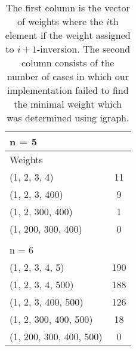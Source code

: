 \documentclass{article}
\begin{document}
\begin{table}[ht]
  \centering
  \begin{tabularx}{\linewidth}{lc}
  \multicolumn{2}{l}{n = 5} \\
  \midrule
  Weights &  \\
  \midrule
  (1, 2, 3, 4) & 11 \\
  (1, 2, 3, 400) & 9 \\
  (1, 2, 300, 400) & 1 \\
  (1, 200, 300, 400) & 0\\ 
  \\
  \toprule
  \multicolumn{2}{l}{n = 6} \\
  \midrule
  (1, 2, 3, 4, 5) &  190  \\
  (1, 2, 3, 4, 500) & 188 \\
  (1, 2, 3, 400, 500) & 126 \\
  (1, 2, 300, 400, 500) & 18 \\
  (1, 200, 300, 400, 500) & 0 \\
  \end{tabularx}
  \label{tab: testresults}
  \caption{The first column is the vector of weights where the $i$th element if the weight assigned to $i+1$-inversion. The second column consists of the number of cases in which our implementation failed to find the minimal weight which was determined using igraph.}
\end{table}
\end{document}
